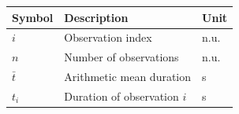 \begin{tabularx}{\textwidth}{lXl}
\toprule Symbol & Description & Unit\\\midrule
$i$ & Observation index & n.u.\\
$n$ & Number of observations & n.u.\\
$\bar{t}$ & Arithmetic mean duration & s\\
$t_i$ & Duration of observation $i$ & s\\\bottomrule
\end{tabularx}\par

